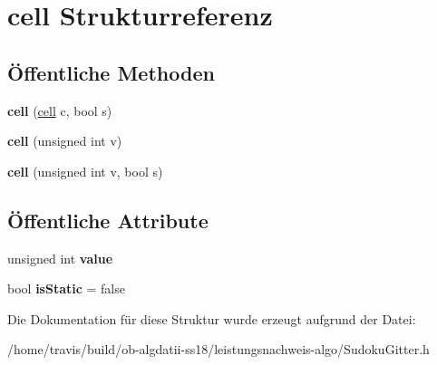 \hypertarget{structcell}{\section{cell Strukturreferenz}
\label{structcell}
}
\subsection*{Öffentliche Methoden}
\begin{DoxyCompactItemize}
\item 
\hypertarget{structcell_a39205d6ef513c6aaa0fd498508b00f45}{{\bfseries cell} (\hyperlink{structcell}{cell} c, bool s)}\label{structcell_a39205d6ef513c6aaa0fd498508b00f45}

\item 
\hypertarget{structcell_a9fa902f945a669ce90bd4fe15eb544b7}{{\bfseries cell} (unsigned int v)}\label{structcell_a9fa902f945a669ce90bd4fe15eb544b7}

\item 
\hypertarget{structcell_a1a7a8dacc857c621493a9c4449dfbc27}{{\bfseries cell} (unsigned int v, bool s)}\label{structcell_a1a7a8dacc857c621493a9c4449dfbc27}

\end{DoxyCompactItemize}
\subsection*{Öffentliche Attribute}
\begin{DoxyCompactItemize}
\item 
\hypertarget{structcell_a8b7117e2744d846b400ec523b219d0f5}{unsigned int {\bfseries value}}\label{structcell_a8b7117e2744d846b400ec523b219d0f5}

\item 
\hypertarget{structcell_a75fe1718d002bd591ab30ce72d0fa5f4}{bool {\bfseries is\-Static} = false}\label{structcell_a75fe1718d002bd591ab30ce72d0fa5f4}

\end{DoxyCompactItemize}


Die Dokumentation für diese Struktur wurde erzeugt aufgrund der Datei\-:\begin{DoxyCompactItemize}
\item 
/home/travis/build/ob-\/algdatii-\/ss18/leistungsnachweis-\/algo/Sudoku\-Gitter.\-h\end{DoxyCompactItemize}
